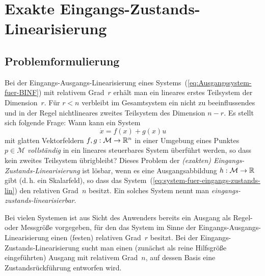 \section{Exakte Eingangs-Zustands-Linearisierung\label{sec:Exakte-Eingangs-Zustands-Linearisierung}}

\subsection{Problemformulierung\label{subsec:EZ-Linearisierung-Problemformulierung}}

Bei der Eingangs-Ausgangs-Linearisierung eines Systems~(\ref{eq:Ausgangssystem-fuer-BINF})
mit relativem Grad~$r$ erhält man ein lineares erstes Teilsystem
der Dimension~$r$. Für $r<n$ verbleibt im Gesamtsystem ein nicht
zu beeinflussendes und in der Regel nichtlineares zweites Teilsystem
des Dimension $n-r$. Es stellt sich folgende Frage: Wann kann ein
System 
\begin{equation}
\dot{x}=f(x)+g(x)u\label{eq:system-fuer-eingangs-zustands-lin}
\end{equation}
mit glatten Vektorfeldern $f,g:\mathcal{M}\to{\mathbb{R}}^{n}$ in einer Umgebung
eines Punktes $p\in\mathcal{M}$ \textit{vollständig} in ein lineares
steuerbares System überführt werden, so dass kein zweites Teil\-system
übrigbleibt? Dieses Problem der \emph{(exakten) Eingangs-Zustands-Linearisierung}
ist lösbar, wenn es eine Ausgangsabbildung $h:\mathcal{M}\to{\mathbb{R}}$ gibt
(d.\,h. ein Skalarfeld), so dass das System~(\ref{eq:system-fuer-eingangs-zustands-lin})
den relativen Grad~$n$ besitzt. Ein solches System nennt man \emph{eingangs-zustands-linearisierbar}. 

Bei vielen Systemen ist aus Sicht des Anwenders bereits ein Ausgang
als Regel- oder Messgröße vorgegeben, für den das System im Sinne
der Eingangs-Ausgangs-Linearisierung einen (festen) relativen Grad~$r$
besitzt. Bei der Eingangs-Zustands-Linearisierung sucht man einen
(zunächst als reine Hilfsgröße eingeführten) Ausgang mit relativem
Grad~$n$, auf dessen Basis eine Zustandsrückführung entworfen wird.

